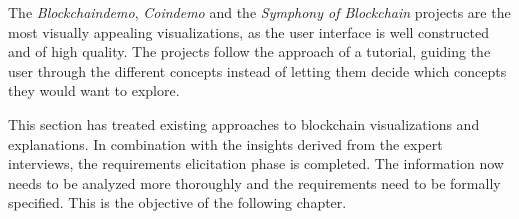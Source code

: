 The \textit{Blockchaindemo}, \textit{Coindemo} and the \textit{Symphony of Blockchain} projects are the most visually appealing visualizations, as the user interface is well constructed and of high quality. The projects follow the approach of a tutorial, guiding the user through the different concepts instead of letting them decide which concepts they would want to explore.

This section has treated existing approaches to blockchain visualizations and explanations. In combination with the insights derived from the expert interviews, the requirements elicitation phase is completed. The information now needs to be analyzed more thoroughly and the requirements need to be formally specified. This is the objective of the following chapter.